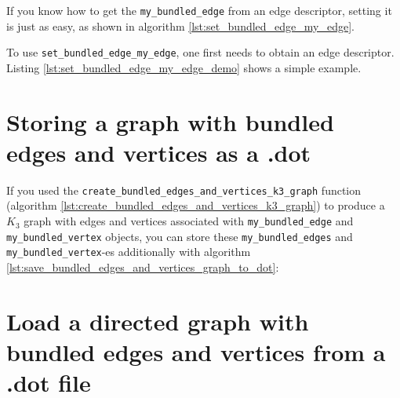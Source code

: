 If you know how to get the \verb;my_bundled_edge; 
from an edge descriptor, 
setting it is just as easy, 
as shown in algorithm \ref{lst:set_bundled_edge_my_edge}.



To use \verb;set_bundled_edge_my_edge;, 
one first needs to obtain an edge descriptor.
Listing \ref{lst:set_bundled_edge_my_edge_demo}
shows a simple example.



\section{Storing a graph with bundled edges and vertices as a .dot}
\label{subsec:save_bundled_edges_and_vertices_graph_to_dot}

If you used the \verb;create_bundled_edges_and_vertices_k3_graph; 
function (algorithm \ref{lst:create_bundled_edges_and_vertices_k3_graph}) 
to produce a $K_{3}$ graph with edges and vertices 
associated with \verb;my_bundled_edge; 
and \verb;my_bundled_vertex; objects, 
you can store these 
\verb;my_bundled_edges; and 
\verb;my_bundled_vertex;-es
additionally with algorithm \ref{lst:save_bundled_edges_and_vertices_graph_to_dot}:



\section{Load a directed graph with bundled edges and vertices from a .dot file}
\label{subsec:sub:load_directed_bundled_edges_and_vertices_graph_from_dot}

